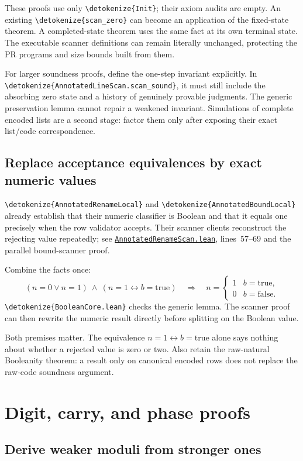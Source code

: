 \documentclass[11pt,letterpaper]{article}
\newcommand{\code}[1]{\expandafter\nolinkurl\expandafter{\detokenize{#1}}}
\newcommand{\repo}{https://github.com/VladimirReshetnikov/ProveIt/blob/60e9c5d620c6c387d932876cfa2d9376f64ea56c}
\newcommand{\src}[2]{\href{\repo/Computability/DiophantineConsistency/Lean/DiophantineConsistency/#1.lean}{\nolinkurl{#1.lean}}, lines~#2}
\begin{document}
These proofs use only \code{Init}; their axiom audits are empty. An existing \code{scan_zero} can become an application of the fixed-state theorem. A completed-state theorem uses the same fact at its own terminal state. The executable scanner definitions can remain literally unchanged, protecting the PR programs and size bounds built from them.

For larger soundness proofs, define the one-step invariant explicitly. In \code{AnnotatedLineScan.scan_sound}, it must still include the absorbing zero state and a history of genuinely provable judgments. The generic preservation lemma cannot repair a weakened invariant. Simulations of complete encoded lists are a second stage: factor them only after exposing their exact list/code correspondence.

\subsection{Replace acceptance equivalences by exact numeric values}

\code{AnnotatedRenameLocal} and \code{AnnotatedBoundLocal} already establish that their numeric classifier is Boolean and that it equals one precisely when the row validator accepts. Their scanner clients reconstruct the rejecting value repeatedly; see \src{AnnotatedRenameScan}{57--69} and the parallel bound-scanner proof.

Combine the facts once:
\[
(n=0\lor n=1)\ \wedge\ (n=1\leftrightarrow b=\mathrm{true})
\quad\Longrightarrow\quad
n=\begin{cases}1&b=\mathrm{true},\\0&b=\mathrm{false}.
\end{cases}
\]
\code{BooleanCore.lean} checks the generic lemma. The scanner proof can then rewrite the numeric result directly before splitting on the Boolean value.

Both premises matter. The equivalence $n=1\leftrightarrow b=\mathrm{true}$ alone says nothing about whether a rejected value is zero or two. Also retain the raw-natural Booleanity theorem: a result only on canonical encoded rows does not replace the raw-code soundness argument.

\section{Digit, carry, and phase proofs}

\subsection{Derive weaker moduli from stronger ones}
\end{document}
